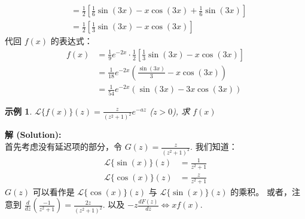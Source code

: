 \documentclass[linespread=1.5,openany]{book}%
\theoremstyle{plain}
\newtheorem{example}[theorem]{示例}
\begin{document}
{{{{\begin{align*}
							&= \frac{1}{2} \left[ \frac{1}{6}\sin(3x) - x\cos(3x) + \frac{1}{6}\sin(3x) \right] \\
							&= \frac{1}{2} \left[ \frac{1}{3}\sin(3x) - x\cos(3x) \right]
						\end{align*}
						代回 $f(x)$ 的表达式：
						\begin{align*}
							f(x) &= \frac{1}{9} e^{-2x} \cdot \frac{1}{2} \left[ \frac{1}{3}\sin(3x) - x\cos(3x) \right] \\
							&= \frac{1}{18} e^{-2x} \left( \frac{\sin(3x)}{3} - x\cos(3x) \right) \\
							&= \frac{1}{54} e^{-2x} (\sin(3x) - 3x\cos(3x))
						\end{align*}
						\vspace{1.5\baselineskip}
						
						\begin{example} $\mathcal{L}\{f(x)\}(z) = \frac{z}{(z^2+1)^2} e^{-az}$ ($z>0$), 求 $f(x)$ \label{ex:L15_ch_app_inv_laplace2}
						\end{example}
						
						\noindent\textbf{解 (Solution):} \\
						首先考虑没有延迟项的部分，令 $G(z) = \frac{z}{(z^2+1)^2}$.
						我们知道：
						\begin{align*}
							\mathcal{L}\{\sin(x)\}(z) &= \frac{1}{z^2+1} \\
							\mathcal{L}\{\cos(x)\}(z) &= \frac{z}{z^2+1}
						\end{align*}
						$G(z)$ 可以看作是 $\mathcal{L}\{\cos(x)\}(z)$ 与 $\mathcal{L}\{\sin(x)\}(z)$ 的乘积。
						或者，注意到 $\frac{d}{dz} \left(\frac{-1}{z^2+1}\right) = \frac{2z}{(z^2+1)^2}$.
						以及 $-z \frac{dF(z)}{dz} \Leftrightarrow xf(x)$.
						
}}}}
\end{document}
